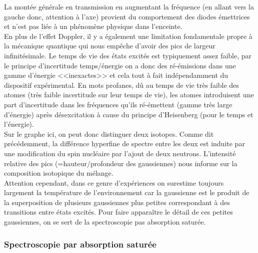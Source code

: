 La montée générale en transmission en augmentant la fréquence (en allant vers la gauche donc, attention à l'axe) provient du comportement des diodes émettrices et n'est pas liée à un phénomène physique dans l'enceinte.\\

En plus de l'effet Doppler, il y a également une limitation fondamentale propre à la mécanique quantique qui nous empêche d'avoir des pics de largeur infinitésimale. Le temps de vie des états excités est typiquement assez faible, par le principe d'incertitude temps/énergie on a donc des ré-émissions dans une gamme d'énergie <<inexactes>> et cela tout à fait indépendamment du dispositif expérimental. En mots profanes, dû au temps de vie très faible des atomes (très faible incertitude sur leur temps de vie), les atomes introduisent une part d'incertitude dans les fréquences qu'ils ré-émettent (gamme très large d'énergie) après désexcitation à cause du principe d'Heisenberg (pour le temps et l'énergie).\\

Sur le graphe ici, on peut donc distinguer deux isotopes. Comme dit précédemment, la différence hyperfine de spectre entre les deux est induite par une modification du spin nucléaire par l'ajout de deux neutrons. L'intensité relative des pics (=hauteur/profondeur des gaussiennes) nous informe sur la composition isotopique du mélange.\\

Attention cependant, dans ce genre d'expériences on surestime toujours largement la température de l'environnement car la gaussienne est le produit de la superposition de plusieurs gaussiennes plus petites correspondant à des transitions entre états excités. Pour faire apparaître le détail de ces petites gaussiennes, on se sert de la spectroscopie pas absorption saturée.


\subsubsection{Spectroscopie par absorption saturée}


